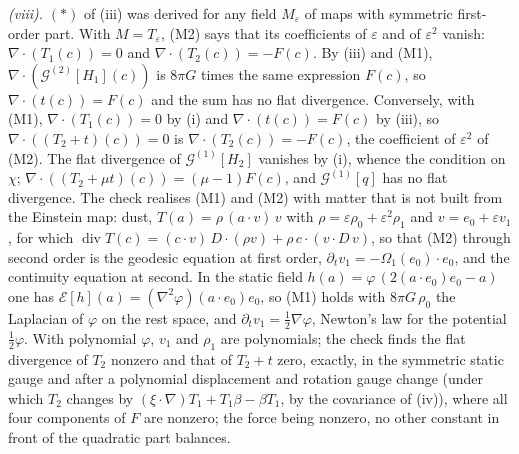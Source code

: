 \emph{(viii).} $(*)$ of (iii) was derived for any field $M_{\varepsilon}$ of maps with symmetric first-order part. With $M = T_{\varepsilon}$, (M2) says that its coefficients of $\varepsilon$ and of $\varepsilon^{2}$ vanish: $\nabla \cdot (T_{1}(c)) = 0$ and $\nabla \cdot (T_{2}(c)) = -F(c)$. By (iii) and (M1), $\nabla \cdot (\mathcal{G}^{(2)}[H_{1}](c))$ is $8\pi G$ times the same expression $F(c)$, so $\nabla \cdot (t(c)) = F(c)$ and the sum has no flat divergence. Conversely, with (M1), $\nabla \cdot (T_{1}(c)) = 0$ by (i) and $\nabla \cdot (t(c)) = F(c)$ by (iii), so $\nabla \cdot ((T_{2} + t)(c)) = 0$ is $\nabla \cdot (T_{2}(c)) = -F(c)$, the coefficient of $\varepsilon^{2}$ of (M2). The flat divergence of $\mathcal{G}^{(1)}[H_{2}]$ vanishes by (i), whence the condition on $\chi$; $\nabla \cdot ((T_{2} + \mu t)(c)) = (\mu - 1)F(c)$, and $\mathcal{G}^{(1)}[q]$ has no flat divergence. The check realises (M1) and (M2) with matter that is not built from the Einstein map: dust, $T(a) = \rho\,(a \cdot v)\,v$ with $\rho = \varepsilon\rho_{0} + \varepsilon^{2}\rho_{1}$ and $v = e_{0} + \varepsilon v_{1}$, for which $\operatorname{div}T(c) = (c \cdot v)\,D \cdot (\rho v) + \rho\,c \cdot (v \cdot D\,v)$, so that (M2) through second order is the geodesic equation at first order, $\partial_{t}v_{1} = -\Omega_{1}(e_{0}) \cdot e_{0}$, and the continuity equation at second. In the static field $h(a) = \varphi\,(2(a \cdot e_{0})e_{0} - a)$ one has $\mathcal{E}[h](a) = (\nabla^{2}\varphi)(a \cdot e_{0})e_{0}$, so (M1) holds with $8\pi G\,\rho_{0}$ the Laplacian of $\varphi$ on the rest space, and $\partial_{t}v_{1} = \tfrac12\nabla\varphi$, Newton's law for the potential $\tfrac12\varphi$. With polynomial $\varphi$, $v_{1}$ and $\rho_{1}$ are polynomials; the check finds the flat divergence of $T_{2}$ nonzero and that of $T_{2} + t$ zero, exactly, in the symmetric static gauge and after a polynomial displacement and rotation gauge change (under which $T_{2}$ changes by $(\xi \cdot \nabla)T_{1} + T_{1}\beta - \beta T_{1}$, by the covariance of (iv)), where all four components of $F$ are nonzero; the force being nonzero, no other constant in front of the quadratic part balances.

